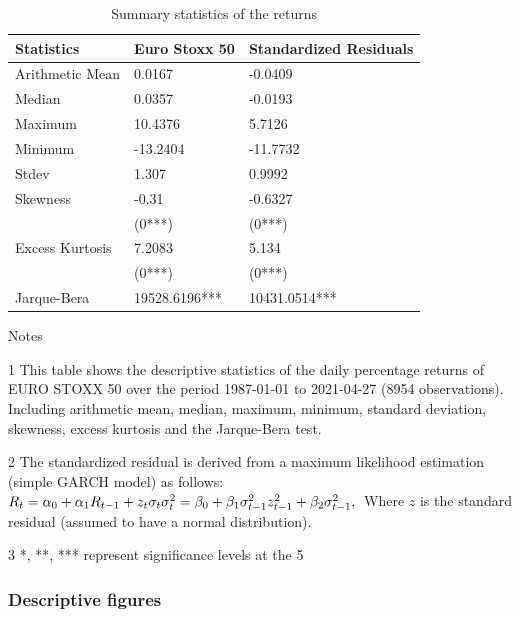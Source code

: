 \documentclass[a4paper, twoside]{templates/ociamthesis}
\begin{document}
\begin{table}[h!]

\caption{\label{tab:dsTable}Summary statistics of the returns}
\centering
\begin{threeparttable}
\begin{tabular}[t]{lll}
\toprule
Statistics & Euro Stoxx 50 & Standardized Residuals\\
\midrule
Arithmetic Mean & 0.0167 & -0.0409\\
Median & 0.0357 & -0.0193\\
Maximum & 10.4376 & 5.7126\\
Minimum & -13.2404 & -11.7732\\
Stdev & 1.307 & 0.9992\\
\addlinespace
Skewness & -0.31 & -0.6327\\
 & (0***) & (0***)\\
Excess Kurtosis & 7.2083 & 5.134\\
 & (0***) & (0***)\\
Jarque-Bera & 19528.6196*** & 10431.0514***\\
\bottomrule
\end{tabular}
\begin{tablenotes}
\item Notes
\item[1] This table shows the descriptive statistics of the daily percentage returns of EURO STOXX 50 over the period 1987-01-01 to 2021-04-27 (8954 observations). Including arithmetic mean, median, maximum, minimum, standard deviation, skewness, excess kurtosis and the Jarque-Bera test.
\item[2] The standardized residual is derived from a maximum likelihood estimation (simple GARCH model) as follows:  $ R_t=\alpha_0+\alpha_1 R_{t-1}+z_t \sigma_t \\ \sigma_t^2=\beta_0+\beta_1 \sigma_{t-1}^2 z_{t-1}^2+\beta_2 \sigma_{t-1}^2, \\$ Where $z$ is the standard residual (assumed to have a normal distribution).
\item[3] *, **, *** represent significance levels at the 5%
\end{tablenotes}
\end{threeparttable}
\end{table}

\hypertarget{descriptive-figures}{%
\subsubsection{Descriptive figures}\label{descriptive-figures}}
\end{document}
